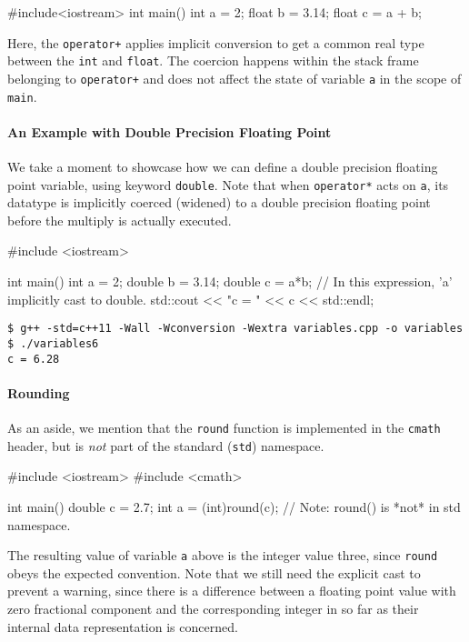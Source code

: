 \documentclass[12pt,letterpaper,twoside]{article}
\begin{document}
\begin{cpp}
#include<iostream>
int main() {
  int a = 2;
  float b = 3.14;
  float c = a + b;
}
\end{cpp}

Here, the \texttt{operator+} applies implicit conversion to get a
common real type between the \texttt{int} and
\texttt{float}. The coercion happens within the stack frame belonging
to \texttt{operator+} and does not affect the state of variable
\texttt{a} in the scope of \texttt{main}. 

\paragraph{An Example with Double Precision Floating Point} We take a moment to
showcase how we can define a double precision floating point
variable, using keyword \texttt{double}. Note that when
\texttt{operator*} acts on \texttt{a}, its datatype is implicitly
coerced (widened) to a double precision floating point before the
multiply is actually executed.
\begin{cpp}
#include <iostream>

int main() {
  int    a = 2;
  double b = 3.14;
  double c = a*b;   // In this expression, 'a' implicitly cast to double.
  std::cout << "c = " << c << std::endl;
}
\end{cpp}

\begin{verbatim}
$ g++ -std=c++11 -Wall -Wconversion -Wextra variables.cpp -o variables
$ ./variables6
c = 6.28
\end{verbatim}

\paragraph{Rounding} As an aside, we mention that the \texttt{round}
function is implemented in the \texttt{cmath} header, but is
\emph{not} part of the standard (\texttt{std}) namespace.
\begin{cpp}
#include <iostream>
#include <cmath>

int main() {
  double c = 2.7;
  int a = (int)round(c);  // Note: round() is *not* in std namespace.
}
\end{cpp}

The resulting value of variable \texttt{a} above is the integer value three,
since \texttt{round} obeys the expected convention.
Note that we still need the explicit cast to prevent a warning, since
there is a difference between a floating point value with zero
fractional component and the corresponding integer in so far as their
internal data representation is concerned.
\end{document}
